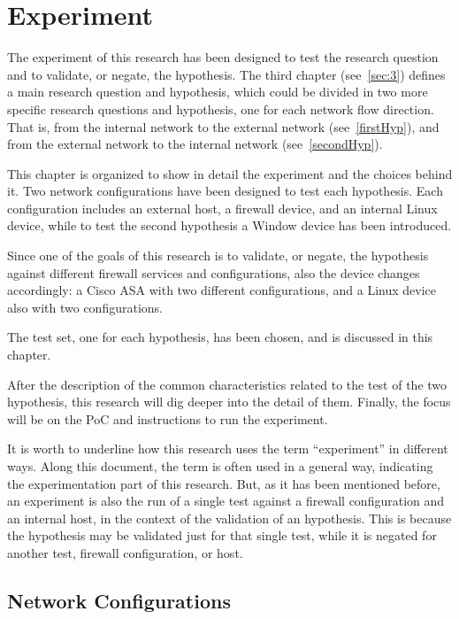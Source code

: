 \documentclass[12pt]{article}
\begin{document}
\pagebreak

\section{Experiment}
\label{sec:5}

The experiment of this research has been designed to test the research question and to validate, or negate, the hypothesis. The third chapter (see~\ref{sec:3}) defines a main research question and hypothesis, which could be divided in two more specific research questions and hypothesis, one for each network flow direction. That is, from the internal network to the external network (see~\ref{firstHyp}), and from the external network to the internal network (see~\ref{secondHyp}).

This chapter is organized to show in detail the experiment and the choices behind it. Two network configurations have been designed to test each hypothesis. Each configuration includes an external host, a firewall device, and an internal Linux device, while to test the second hypothesis a Window device has been introduced. 

Since one of the goals of this research is to validate, or negate, the hypothesis against different firewall services and configurations, also the device changes accordingly: a Cisco ASA with two different configurations, and a Linux device also with two configurations.

The test set, one for each hypothesis, has been chosen, and is discussed in this chapter.

After the description of the common characteristics related to the test of the two hypothesis, this research will dig deeper into the detail of them. Finally, the focus will be on the PoC and instructions to run the experiment.

It is worth to underline how this research uses the term ``experiment'' in different ways. Along this document, the term is often used in a general way, indicating the experimentation part of this research. But, as it has been mentioned before, an experiment is also the run of a single test against a firewall configuration and an internal host, in the context of the validation of an hypothesis. This is because the hypothesis may be validated just for that single test, while it is negated for another test, firewall configuration, or host. 

\subsection{Network Configurations}
\label{subsection:netConfigurations}
\end{document}
